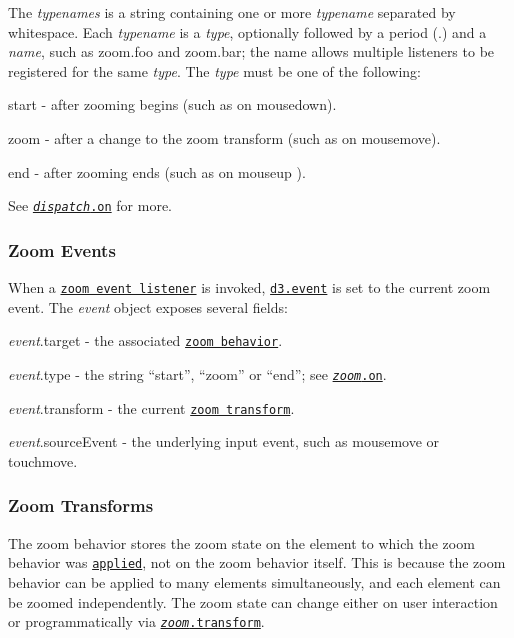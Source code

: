 The {\itshape typenames} is a string containing one or more {\itshape typename} separated by whitespace. Each {\itshape typename} is a {\itshape type}, optionally followed by a period ({\ttfamily .}) and a {\itshape name}, such as {\ttfamily zoom.\+foo} and {\ttfamily zoom.\+bar}; the name allows multiple listeners to be registered for the same {\itshape type}. The {\itshape type} must be one of the following\+:


\begin{DoxyItemize}
\item {\ttfamily start} -\/ after zooming begins (such as on mousedown).
\item {\ttfamily zoom} -\/ after a change to the zoom transform (such as on mousemove).
\item {\ttfamily end} -\/ after zooming ends (such as on mouseup ).
\end{DoxyItemize}

See \href{https://github.com/d3/d3-dispatch#dispatch_on}{\tt {\itshape dispatch}.on} for more.

\subsubsection*{Zoom Events}

When a \href{#zoom_on}{\tt zoom event listener} is invoked, \href{https://github.com/d3/d3-selection#event}{\tt d3.\+event} is set to the current zoom event. The {\itshape event} object exposes several fields\+:


\begin{DoxyItemize}
\item {\itshape event}.target -\/ the associated \href{#zoom}{\tt zoom behavior}.
\item {\itshape event}.type -\/ the string “start”, “zoom” or “end”; see \href{#zoom_on}{\tt {\itshape zoom}.on}.
\item {\itshape event}.transform -\/ the current \href{#zoom-transforms}{\tt zoom transform}.
\item {\itshape event}.source\+Event -\/ the underlying input event, such as mousemove or touchmove.
\end{DoxyItemize}

\subsubsection*{Zoom Transforms}

The zoom behavior stores the zoom state on the element to which the zoom behavior was \href{#_zoom}{\tt applied}, not on the zoom behavior itself. This is because the zoom behavior can be applied to many elements simultaneously, and each element can be zoomed independently. The zoom state can change either on user interaction or programmatically via \href{#zoom_transform}{\tt {\itshape zoom}.transform}.

